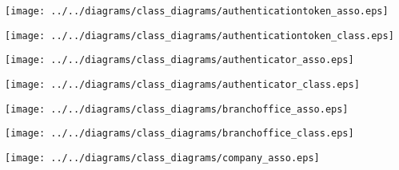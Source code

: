 
    \begin{frame}
    \begin{center}
    \texttt{[image: ../../diagrams/class\_diagrams/authenticationtoken\_asso.eps]}
    \end{center}
    \end{frame}
    

    \begin{frame}
    \begin{center}
    \texttt{[image: ../../diagrams/class\_diagrams/authenticationtoken\_class.eps]}
    \end{center}
    \end{frame}
    

    \begin{frame}
    \begin{center}
    \texttt{[image: ../../diagrams/class\_diagrams/authenticator\_asso.eps]}
    \end{center}
    \end{frame}
    

    \begin{frame}
    \begin{center}
    \texttt{[image: ../../diagrams/class\_diagrams/authenticator\_class.eps]}
    \end{center}
    \end{frame}
    

    \begin{frame}
    \begin{center}
    \texttt{[image: ../../diagrams/class\_diagrams/branchoffice\_asso.eps]}
    \end{center}
    \end{frame}
    

    \begin{frame}
    \begin{center}
    \texttt{[image: ../../diagrams/class\_diagrams/branchoffice\_class.eps]}
    \end{center}
    \end{frame}
    

    \begin{frame}
    \begin{center}
    \texttt{[image: ../../diagrams/class\_diagrams/company\_asso.eps]}
    \end{center}
    \end{frame}
    

